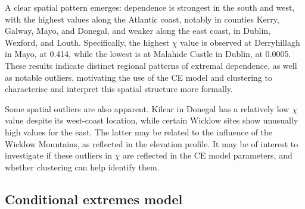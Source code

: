 \documentclass[12pt]{article}
\begin{document}
A clear spatial pattern emerges: dependence is strongest in the south and west, with the highest values along the Atlantic coast, notably in counties Kerry, Galway, Mayo, and Donegal, and weaker along the east coast, in Dublin, Wexford, and Louth. 
Specifically, the highest $\chi$ value is observed at Derryhillagh in Mayo, at 0.414, while the lowest is at Malahide Castle in Dublin, at 0.0005.
These results indicate distinct regional patterns of extremal dependence, as well as notable outliers, motivating the use of the CE model and clustering to characterise and interpret this spatial structure more formally. 

Some spatial outliers are also apparent. 
Kilcar in Donegal has a relatively low $\chi$ value despite its west-coast location, while certain Wicklow sites show unusually high values for the east. 
The latter may be related to the influence of the Wicklow Mountains, as reflected in the elevation profile. 
It may be of interest to investigate if these outliers in $\chi$ are reflected in the CE model parameters, and whether clustering can help identify them.

\subsection{Conditional extremes model}~\label{subsec:app_ce}
\end{document}
